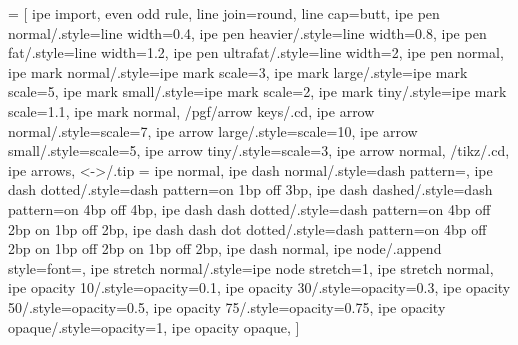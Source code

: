  = [
  ipe import,
  even odd rule,
  line join=round,
  line cap=butt,
  ipe pen normal/.style={line width=0.4},
  ipe pen heavier/.style={line width=0.8},
  ipe pen fat/.style={line width=1.2},
  ipe pen ultrafat/.style={line width=2},
  ipe pen normal,
  ipe mark normal/.style={ipe mark scale=3},
  ipe mark large/.style={ipe mark scale=5},
  ipe mark small/.style={ipe mark scale=2},
  ipe mark tiny/.style={ipe mark scale=1.1},
  ipe mark normal,
  /pgf/arrow keys/.cd,
  ipe arrow normal/.style={scale=7},
  ipe arrow large/.style={scale=10},
  ipe arrow small/.style={scale=5},
  ipe arrow tiny/.style={scale=3},
  ipe arrow normal,
  /tikz/.cd,
  ipe arrows, %
  <->/.tip = ipe normal,
  ipe dash normal/.style={dash pattern=},
  ipe dash dotted/.style={dash pattern=on 1bp off 3bp},
  ipe dash dashed/.style={dash pattern=on 4bp off 4bp},
  ipe dash dash dotted/.style={dash pattern=on 4bp off 2bp on 1bp off 2bp},
  ipe dash dash dot dotted/.style={dash pattern=on 4bp off 2bp on 1bp off 2bp on 1bp off 2bp},
  ipe dash normal,
  ipe node/.append style={font=\normalsize},
  ipe stretch normal/.style={ipe node stretch=1},
  ipe stretch normal,
  ipe opacity 10/.style={opacity=0.1},
  ipe opacity 30/.style={opacity=0.3},
  ipe opacity 50/.style={opacity=0.5},
  ipe opacity 75/.style={opacity=0.75},
  ipe opacity opaque/.style={opacity=1},
  ipe opacity opaque,
]
